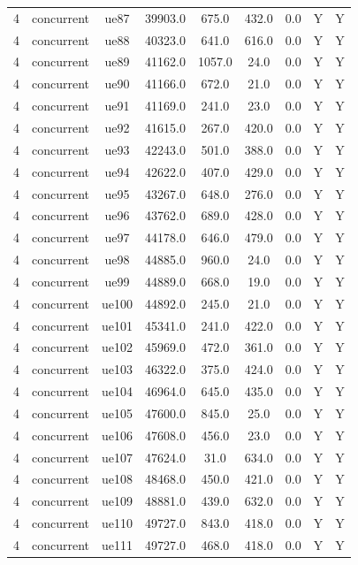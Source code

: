\begin{table}[ht]
\begin{tabular}{|c|c|c|c|c|c|c|c|c|}
4 & concurrent & ue87 & 39903.0 & 675.0 & 432.0 & 0.0 & Y & Y \\
4 & concurrent & ue88 & 40323.0 & 641.0 & 616.0 & 0.0 & Y & Y \\
4 & concurrent & ue89 & 41162.0 & 1057.0 & 24.0 & 0.0 & Y & Y \\
4 & concurrent & ue90 & 41166.0 & 672.0 & 21.0 & 0.0 & Y & Y \\
4 & concurrent & ue91 & 41169.0 & 241.0 & 23.0 & 0.0 & Y & Y \\
4 & concurrent & ue92 & 41615.0 & 267.0 & 420.0 & 0.0 & Y & Y \\
4 & concurrent & ue93 & 42243.0 & 501.0 & 388.0 & 0.0 & Y & Y \\
4 & concurrent & ue94 & 42622.0 & 407.0 & 429.0 & 0.0 & Y & Y \\
4 & concurrent & ue95 & 43267.0 & 648.0 & 276.0 & 0.0 & Y & Y \\
4 & concurrent & ue96 & 43762.0 & 689.0 & 428.0 & 0.0 & Y & Y \\
4 & concurrent & ue97 & 44178.0 & 646.0 & 479.0 & 0.0 & Y & Y \\
4 & concurrent & ue98 & 44885.0 & 960.0 & 24.0 & 0.0 & Y & Y \\
4 & concurrent & ue99 & 44889.0 & 668.0 & 19.0 & 0.0 & Y & Y \\
4 & concurrent & ue100 & 44892.0 & 245.0 & 21.0 & 0.0 & Y & Y \\
4 & concurrent & ue101 & 45341.0 & 241.0 & 422.0 & 0.0 & Y & Y \\
4 & concurrent & ue102 & 45969.0 & 472.0 & 361.0 & 0.0 & Y & Y \\
4 & concurrent & ue103 & 46322.0 & 375.0 & 424.0 & 0.0 & Y & Y \\
4 & concurrent & ue104 & 46964.0 & 645.0 & 435.0 & 0.0 & Y & Y \\
4 & concurrent & ue105 & 47600.0 & 845.0 & 25.0 & 0.0 & Y & Y \\
4 & concurrent & ue106 & 47608.0 & 456.0 & 23.0 & 0.0 & Y & Y \\
4 & concurrent & ue107 & 47624.0 & 31.0 & 634.0 & 0.0 & Y & Y \\
4 & concurrent & ue108 & 48468.0 & 450.0 & 421.0 & 0.0 & Y & Y \\
4 & concurrent & ue109 & 48881.0 & 439.0 & 632.0 & 0.0 & Y & Y \\
4 & concurrent & ue110 & 49727.0 & 843.0 & 418.0 & 0.0 & Y & Y \\
4 & concurrent & ue111 & 49727.0 & 468.0 & 418.0 & 0.0 & Y & Y \\

\end{tabular}
\end{table}
